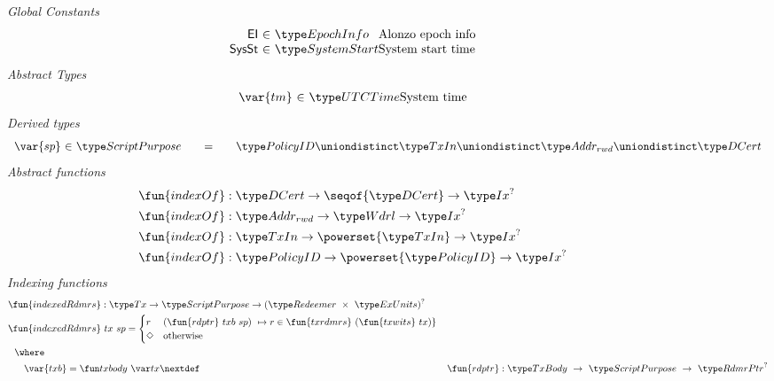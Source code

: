 \begin{figure}[htb]
  \emph{Global Constants}
  \begin{equation*}
    \begin{array}{r@{~\in~}l@{}lr}
      \mathsf{EI}
      & \EpochInfo
      & \text{Alonzo epoch info} \\
      \mathsf{SysSt}
      & \SystemStart
      & \text{System start time}
    \end{array}
  \end{equation*}
  \emph{Abstract Types}
  \begin{equation*}
    \begin{array}{r@{~\in~}l@{}lr}
      \var{tm}
      & \UTCTime
      & \text{System time}
    \end{array}
  \end{equation*}
  \emph{Derived types}
  \begin{equation*}
    \begin{array}{r@{~\in~}l@{\qquad=\qquad}lr}
      \var{sp}
      & \ScriptPurpose
      & \PolicyID \uniondistinct \TxIn \uniondistinct \AddrRWD \uniondistinct \DCert
    \end{array}
  \end{equation*}
  \emph{Abstract functions}
  \begin{align*}
    &\fun{indexOf} : \DCert \to \seqof{\DCert} \to \Ix^?\\
    &\fun{indexOf} : \AddrRWD \to \Wdrl \to \Ix^?\\
    &\fun{indexOf} : \TxIn \to \powerset{\TxIn} \to \Ix^?\\
    &\fun{indexOf} : \PolicyID \to \powerset{\PolicyID} \to \Ix^?
  \end{align*}
  \emph{Indexing functions}
  \begin{align*}
    &\fun{indexedRdmrs} : \Tx \to \ScriptPurpose \to (\Redeemer~\times~\ExUnits)^?\\
    &\fun{indexedRdmrs}~tx~sp =
      \begin{cases}
        r        & (\fun{rdptr}~txb~sp)~ \mapsto r \in \fun{txrdmrs}~(\fun{txwits}~{tx}) \} \\
        \Nothing & \text{otherwise}
      \end{cases} \\
    & ~~\where \\
    & ~~\quad \var{txb} = \txbody{tx}
    \nextdef
    &\fun{rdptr} :\TxBody~\to~\ScriptPurpose~ \to~ \RdmrPtr^? \\

\end{align*}
\end{figure}

